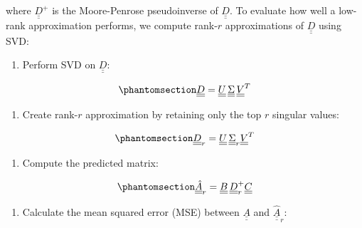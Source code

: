 \documentclass[
]{scrartcl}
\providecommand{\tightlist}{%
  \setlength{\itemsep}{0pt}\setlength{\parskip}{0pt}}\usepackage{longtable,booktabs,array}
\begin{document}
\begin{refsection}
where \(\underline{\underline{D}}^+\) is the Moore-Penrose pseudoinverse
of \(\underline{\underline{D}}\). To evaluate how well a low-rank
approximation performs, we compute rank-\(r\) approximations of
\(\underline{\underline{D}}\) using SVD:

\begin{enumerate}
\def\labelenumi{\arabic{enumi}.}
\tightlist
\item
  Perform SVD on \(\underline{\underline{D}}\):
\end{enumerate}

\begin{equation}\phantomsection\label{eq-crossvalidation-svd-svd}{
\underline{\underline{D}} =
\underline{\underline{U}}\, \underline{\underline{\Sigma}} \,
\underline{\underline{V}}^T
}\end{equation}

\begin{enumerate}
\def\labelenumi{\arabic{enumi}.}
\setcounter{enumi}{1}
\tightlist
\item
  Create rank-\(r\) approximation by retaining only the top \(r\)
  singular values:
\end{enumerate}

\begin{equation}\phantomsection\label{eq-crossvalidation-svd-svd-rank}{
\underline{\underline{D}}_r = \underline{\underline{U}}\,
\underline{\underline{\Sigma}}_r \underline{\underline{V}}^T
}\end{equation}

\begin{enumerate}
\def\labelenumi{\arabic{enumi}.}
\setcounter{enumi}{2}
\tightlist
\item
  Compute the predicted matrix:
\end{enumerate}

\begin{equation}\phantomsection\label{eq-crossvalidation-svd-svd-pred}{
\underline{\underline{\hat{A}}}_r =
\underline{\underline{B}}\, \underline{\underline{D}}_r^+
\underline{\underline{C}}
}\end{equation}

\begin{enumerate}
\def\labelenumi{\arabic{enumi}.}
\setcounter{enumi}{3}
\tightlist
\item
  Calculate the mean squared error (MSE) between
  \(\underline{\underline{A}}\) and
  \(\underline{\underline{\hat{A}}}_r\):
\end{enumerate}


\end{refsection}
\end{document}
